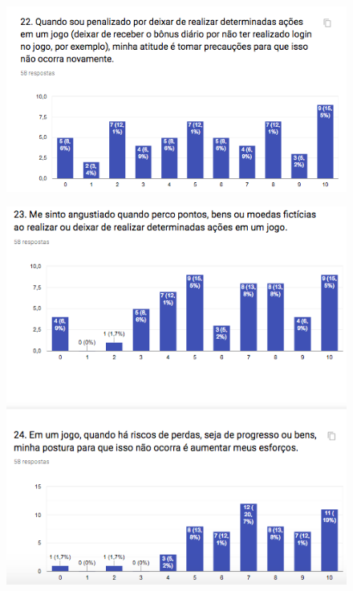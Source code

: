 \begin{apendicesenv}
\begin{figure}[h]
	\centering
	\includegraphics[keepaspectratio=true,scale=1]{figuras/r17.png}
\end{figure}

\begin{figure}[h]
	\centering
	\includegraphics[keepaspectratio=true,scale=1]{figuras/r18.png}
\end{figure}




\end{apendicesenv}
